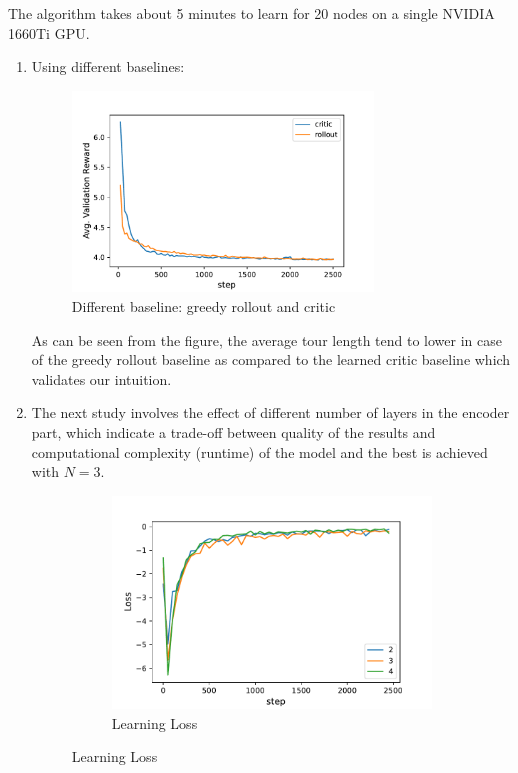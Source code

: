 \documentclass{article}
\theoremstyle{definition}
\begin{document}
The algorithm takes about 5 minutes to learn for 20 nodes on a single NVIDIA 1660Ti GPU.
\begin{enumerate}
    \item Using different baselines:
    \begin{figure}[H]
    \centering
    \includegraphics[width=8cm]{images/rollout-critic.pdf}
    \caption{Different baseline: greedy rollout and critic}
    \label{fig:my_label}
\end{figure}
As can be seen from the figure, the average tour length tend to lower in case of the greedy rollout baseline as compared to the learned critic baseline which validates our intuition. 
\item 
The next study involves the effect of different number of layers in the encoder part, which indicate a trade-off between
quality of the results and computational complexity (runtime) of the model and the best is achieved with $N=3$.
\begin{figure}[H]
\captionsetup[subfigure]{justification=centering}
     \centering
    \begin{subfigure}{0.48\linewidth}
         \centering
         \includegraphics[width=0.9\linewidth]{images/layerloss.pdf}
         \caption{Learning Loss}
        \label{fig:bandit}

\end{subfigure}
\end{figure}
\end{enumerate}
\end{document}

